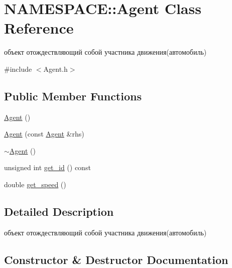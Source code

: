 \hypertarget{class_n_a_m_e_s_p_a_c_e_1_1_agent}{}\section{N\+A\+M\+E\+S\+P\+A\+CE\+:\+:Agent Class Reference}
\label{class_n_a_m_e_s_p_a_c_e_1_1_agent}


объект отождествляющий собой участника движения(автомобиль)  




{\ttfamily \#include $<$Agent.\+h$>$}

\subsection*{Public Member Functions}
\begin{DoxyCompactItemize}
\item 
\hyperlink{class_n_a_m_e_s_p_a_c_e_1_1_agent_ac76c834c460e73aff4266a389a3b2a6a}{Agent} ()
\item 
\hyperlink{class_n_a_m_e_s_p_a_c_e_1_1_agent_a1040c0d468e48f65c9520b05cb3c9f0d}{Agent} (const \hyperlink{class_n_a_m_e_s_p_a_c_e_1_1_agent}{Agent} \&rhs)
\item 
\hyperlink{class_n_a_m_e_s_p_a_c_e_1_1_agent_ad5d59b3b5668ba68796bacb8caae7c21}{$\sim$\+Agent} ()
\item 
unsigned int \hyperlink{class_n_a_m_e_s_p_a_c_e_1_1_agent_a4bbb427bceba0ab5e33d0bb1bb45e95b}{get\+\_\+id} () const
\item 
double \hyperlink{class_n_a_m_e_s_p_a_c_e_1_1_agent_a604e52e3f48bd585218d8fc6277e4ce8}{get\+\_\+speed} ()
\end{DoxyCompactItemize}


\subsection{Detailed Description}
объект отождествляющий собой участника движения(автомобиль) 

\subsection{Constructor \& Destructor Documentation}
\mbox{\label{class_n_a_m_e_s_p_a_c_e_1_1_agent_ac76c834c460e73aff4266a389a3b2a6a}} 
